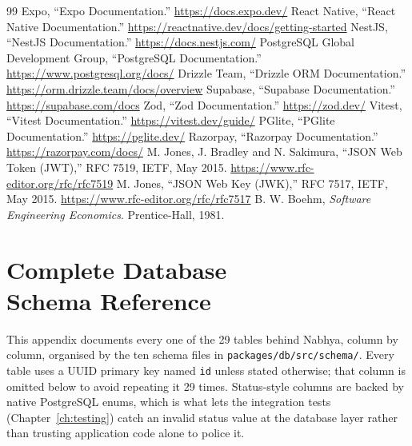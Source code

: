 \clearpage{}
\begin{thebibliography}{99}
 Expo, ``Expo Documentation.'' \url{https://docs.expo.dev/}
 React Native, ``React Native Documentation.'' \url{https://reactnative.dev/docs/getting-started}
 NestJS, ``NestJS Documentation.'' \url{https://docs.nestjs.com/}
 PostgreSQL Global Development Group, ``PostgreSQL Documentation.'' \url{https://www.postgresql.org/docs/}
 Drizzle Team, ``Drizzle ORM Documentation.'' \url{https://orm.drizzle.team/docs/overview}
 Supabase, ``Supabase Documentation.'' \url{https://supabase.com/docs}
 Zod, ``Zod Documentation.'' \url{https://zod.dev/}
 Vitest, ``Vitest Documentation.'' \url{https://vitest.dev/guide/}
 PGlite, ``PGlite Documentation.'' \url{https://pglite.dev/}
 Razorpay, ``Razorpay Documentation.'' \url{https://razorpay.com/docs/}
 M. Jones, J. Bradley and N. Sakimura, ``JSON Web Token (JWT),'' RFC 7519, IETF, May 2015. \url{https://www.rfc-editor.org/rfc/rfc7519}
 M. Jones, ``JSON Web Key (JWK),'' RFC 7517, IETF, May 2015. \url{https://www.rfc-editor.org/rfc/rfc7517}
 B. W. Boehm, \emph{Software Engineering Economics}. Prentice-Hall, 1981.
\end{thebibliography}

\appendix
\renewcommand{\thechapter}{\Alph{chapter}}

\chapter[Complete Database Schema Reference]{Complete Database\\Schema Reference}
\label{app:schema}
This appendix documents every one of the 29 tables behind Nabhya, column by column, organised by the ten schema files in \texttt{packages/db/src/schema/}. Every table uses a UUID primary key named \texttt{id} unless stated otherwise; that column is omitted below to avoid repeating it 29 times. Status-style columns are backed by native PostgreSQL enums, which is what lets the integration tests (Chapter~\ref{ch:testing}) catch an invalid status value at the database layer rather than trusting application code alone to police it.

